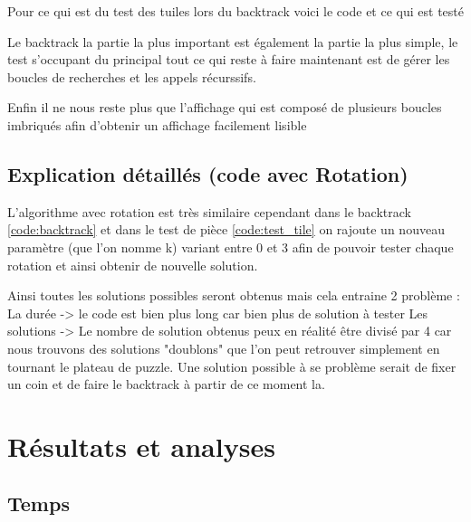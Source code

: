 \documentclass[12pt, openany]{report}
\begin{document}
Pour ce qui est du test des tuiles lors du backtrack voici le code et ce qui est testé
 

Le backtrack la partie la plus important est également la partie la plus simple, le test s'occupant du principal tout ce qui reste à faire maintenant est de gérer les boucles de recherches et les appels récurssifs. 
 

Enfin il ne nous reste plus que l'affichage qui est composé de plusieurs boucles imbriqués afin d'obtenir un affichage facilement lisible 
 

\subsection*{Explication détaillés (code avec Rotation)}

L'algorithme avec rotation est très similaire cependant dans le backtrack \ref{code:backtrack} et dans le test de pièce \ref{code:test_tile} on rajoute un nouveau paramètre (que l'on nomme k) variant entre 0 et 3 afin de pouvoir tester chaque rotation et ainsi obtenir de nouvelle solution.



Ainsi toutes les solutions possibles seront obtenus mais cela entraine 2 problème :
La durée -> le code est bien plus long car bien plus de solution à tester
Les solutions -> Le nombre de solution obtenus peux en réalité être divisé par 4 car nous trouvons des solutions "doublons" que l'on peut retrouver simplement en tournant le plateau de puzzle. Une solution possible à se problème serait de fixer un coin et de faire le backtrack à partir de ce moment la.

\section*{Résultats et analyses}

\subsection*{Temps}
\end{document}
